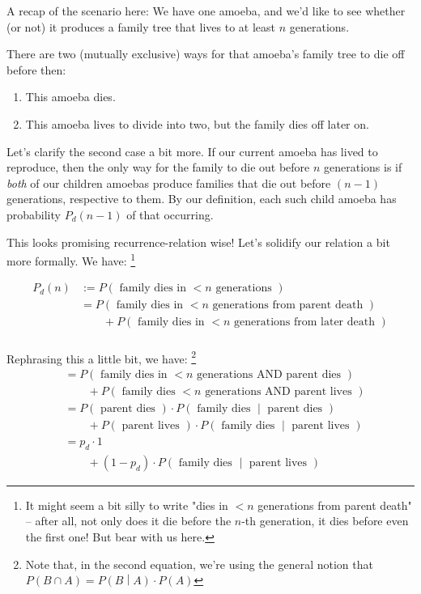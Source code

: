 A recap of the scenario here: We have one amoeba, and we'd like to see whether (or not) it produces a family tree that lives to at least $n$ generations.

There are two (mutually exclusive) ways for that amoeba's family tree to die off before then: 
\begin{enumerate}
\item This amoeba dies.
\item This amoeba lives to divide into two, but the family dies off later on.
\end{enumerate} \hfill

Let's clarify the second case a bit more. If our current amoeba has lived to reproduce, then the only way for the family to die out before $n$ generations is if \emph{both} of our children amoebas produce families that die out before $(n-1)$ generations, respective to them. By our definition, each such child amoeba has probability $P_d(n-1)$ of that occurring.

This looks promising recurrence-relation wise! Let's solidify our relation a bit more formally. We have: \footnote{It might seem a bit silly to write "dies in $<n$ generations from parent death" -- after all, not only does it die before the $n$-th generation, it dies before even the first one! But bear with us here.}

\begin{align*}
P_d(n) &:= P(\text{ family dies in $< n$ generations }) \\
&= P(\text{ family dies in $< n$ generations from parent death }) \\
&\qquad + P(\text{ family dies in $< n$ generations from later death }) \\ %
\end{align*}


Rephrasing this a little bit, we have: \footnote{Note that, in the second equation, we're using the general notion that $P(B \cap A) = P\left(B \middle| A\right) \cdot P(A)$}
\begin{align*}
&= P(\text{ family dies in $< n$ generations AND parent dies }) \\
&\qquad + P(\text{ family dies $< n$ generations AND parent lives }) \\
&= P(\text{ parent dies }) \cdot P\left(\text{ family dies } \middle| \text{ parent dies }\right) \\
&\qquad + P(\text{ parent lives }) \cdot P\left(\text{ family dies } \middle| \text{ parent lives }\right) \\
&= p_d \cdot 1 \\
&\qquad + (1 - p_d) \cdot P\left(\text{ family dies } \middle| \text{ parent lives }\right)
\end{align*}

